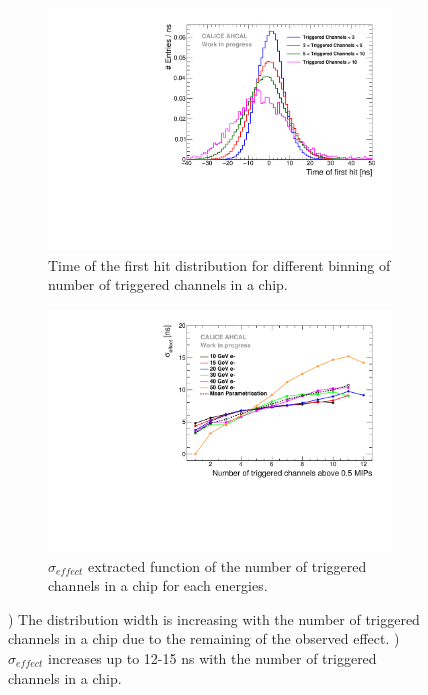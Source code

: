 \begin{figure}[htbp!]
	\begin{subfigure}[t]{0.49\textwidth}
		\centering
		\includegraphics[width=1\linewidth]{../Thesis_Plots/Timing/Electrons/Plots/TimingHitsBins.pdf}
		\caption{Time of the first hit distribution for different binning of number of triggered channels in a chip.} \label{fig:ped_shift_dist_para}
	\end{subfigure}
	\hfill
	\begin{subfigure}[t]{0.49\textwidth}
		\centering
		\includegraphics[width=1\linewidth]{../Thesis_Plots/Timing/Electrons/Plots/MeanParametrisation.pdf}
		\caption{$\sigma_{effect}$ extracted function of the number of triggered channels in a chip for each energies.} \label{fig:para_fit}
	\end{subfigure}
	\caption{) The distribution width is increasing with the number of triggered channels in a chip due to the remaining of the observed effect. ) $\sigma_{effect}$ increases up to 12-15 ns with the number of triggered channels in a chip.}
\end{figure}

